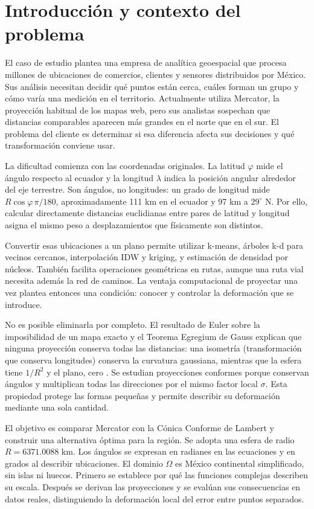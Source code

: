 \section{Introducción y contexto del problema}
El caso de estudio plantea una empresa de analítica geoespacial que procesa millones de ubicaciones de comercios, clientes y sensores distribuidos por México. Sus análisis necesitan decidir qué puntos están cerca, cuáles forman un grupo y cómo varía una medición en el territorio. Actualmente utiliza Mercator, la proyección habitual de los mapas web, pero sus analistas sospechan que distancias comparables aparecen más grandes en el norte que en el sur. El problema del cliente es determinar si esa diferencia afecta sus decisiones y qué transformación conviene usar.

La dificultad comienza con las coordenadas originales. La latitud $\varphi$ mide el ángulo respecto al ecuador y la longitud $\lambda$ indica la posición angular alrededor del eje terrestre. Son ángulos, no longitudes: un grado de longitud mide $R\cos\varphi\,\pi/180$, aproximadamente 111 km en el ecuador y 97 km a $29^\circ$ N. Por ello, calcular directamente distancias euclidianas entre pares de latitud y longitud asigna el mismo peso a desplazamientos que físicamente son distintos.

Convertir esas ubicaciones a un plano permite utilizar k-means, árboles k-d para vecinos cercanos, interpolación IDW y kriging, y estimación de densidad por núcleos. También facilita operaciones geométricas en rutas, aunque una ruta vial necesita además la red de caminos. La ventaja computacional de proyectar una vez plantea entonces una condición: conocer y controlar la deformación que se introduce.

No es posible eliminarla por completo. El resultado de Euler sobre la imposibilidad de un mapa exacto y el Teorema Egregium de Gauss explican que ninguna proyección conserva todas las distancias: una isometría (transformación que conserva longitudes) conserva la curvatura gaussiana, mientras que la esfera tiene $1/R^2$ y el plano, cero \cite{snyder1987,docarmo1976}. Se estudian proyecciones conformes porque conservan ángulos y multiplican todas las direcciones por el mismo factor local $\sigma$. Esta propiedad protege las formas pequeñas y permite describir su deformación mediante una sola cantidad.

El objetivo es comparar Mercator con la Cónica Conforme de Lambert y construir una alternativa óptima para la región. Se adopta una esfera de radio $R=6371.0088$ km. Los ángulos se expresan en radianes en las ecuaciones y en grados al describir ubicaciones. El dominio $\Omega$ es México continental simplificado, sin islas ni huecos. Primero se establece por qué las funciones complejas describen su escala. Después se derivan las proyecciones y se evalúan sus consecuencias en datos reales, distinguiendo la deformación local del error entre puntos separados.
